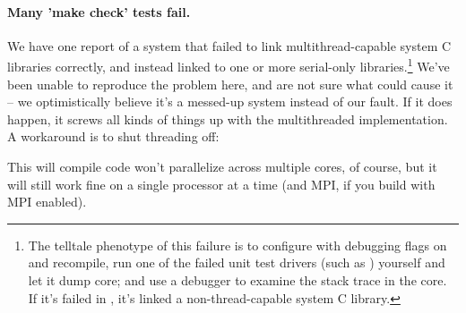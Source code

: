 \paragraph{Many 'make check' tests fail.} We have one report of a
system that failed to link multithread-capable system C libraries
correctly, and instead linked to one or more serial-only
libraries.\footnote{The telltale phenotype of this failure is to
  configure with debugging flags on and recompile, run one of the
  failed unit test drivers (such as )
  yourself and let it dump core; and use a debugger to examine the
  stack trace in the core. If it's failed in
  , it's linked a non-thread-capable
  system C library.} We've been unable to reproduce the problem here,
and are not sure what could cause it -- we optimistically believe it's
a messed-up system instead of our fault. If it does happen, it screws
all kinds of things up with the multithreaded implementation. A
workaround is to shut threading off:


This will compile code won't parallelize across multiple cores, of
course, but it will still work fine on a single processor at a time
(and MPI, if you build with MPI enabled).


